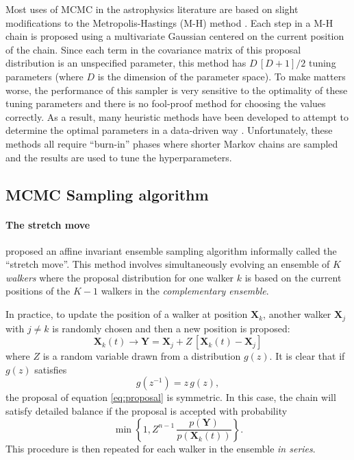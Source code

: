 \documentclass[preprint]{aastex}
\newcommand{\eqlabel}[1]{\label{eq:#1}}
\newcommand{\eq}[1]{equation \ref{eq:#1}}
\begin{document}
Most uses of MCMC in the astrophysics literature are based on slight modifications
to the Metropolis-Hastings (M-H) method \citep[e.g.][]{MacKay:2003}. Each step in
a M-H chain is proposed using a multivariate Gaussian centered on the current
position of the chain. Since each term in the covariance matrix of this proposal
distribution is an unspecified parameter, this method has $D\,[D+1]/2$ tuning parameters
(where $D$ is the dimension of the parameter space).  To make matters worse, the
performance of this sampler is very sensitive to the optimality of these tuning
parameters and there is no fool-proof method for choosing the values correctly.
As a result, many heuristic methods have been developed to attempt to determine
the optimal parameters in a data-driven way \citep[e.g.][]{Gregory:2005,Dunkley:2005,Widrow:2008}.
Unfortunately, these methods all require ``burn-in'' phases where shorter Markov chains
are sampled and the results are used to tune the hyperparameters.

\subsection{MCMC Sampling algorithm}

\paragraph{The stretch move}

\citet{Goodman:2010} proposed an affine invariant ensemble sampling algorithm
informally called the ``stretch move''. This method involves simultaneously
evolving an ensemble of $K$ \emph{walkers} where the proposal distribution for one
walker $k$ is based on the current positions of the $K-1$ walkers in the
\emph{complementary ensemble}.

In practice, to update the position of a walker at position $\mathbf{X}_k$,
another walker $\mathbf{X}_j$ with $j \ne k$ is randomly chosen and then
a new position is proposed:
\begin{equation}
    \eqlabel{proposal}
    \mathbf{X}_k (t) \rightarrow \mathbf{Y} = \mathbf{X}_j + Z \, [\mathbf{X}_k (t) - \mathbf{X}_j]
\end{equation}
where $Z$ is a random variable drawn from a distribution $g(z)$.  It is clear that
if $g(z)$ satisfies
\begin{equation}
    g(z^{-1}) = z \, g(z),
\end{equation}
the proposal of \eq{proposal} is symmetric. In this case, the chain will satisfy
detailed balance if the proposal is accepted with probability
\begin{equation}
    \min \left \{ 1, Z^{n-1} \, \frac{p(\mathbf{Y})}{p(\mathbf{X}_k(t))} \right \}.
\end{equation}
This procedure is then repeated for each walker in the ensemble \emph{in series}.
\end{document}

